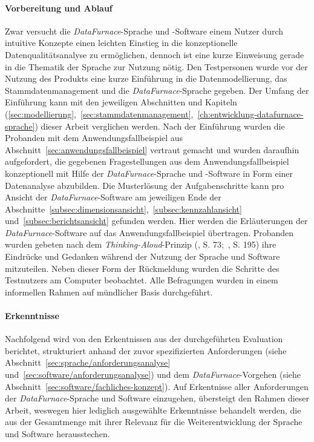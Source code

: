 \documentclass[
  language=german, %
  type=bachelor,%
  ngerman
]{isthesis}
\begin{document}
\begin{content}
\paragraph{Vorbereitung und Ablauf} Zwar versucht die
\textit{DataFurnace}-Sprache und -Software einem Nutzer durch intuitive
Konzepte einen leichten Einstieg in die konzeptionelle Datenqualitätsanalyse zu
ermöglichen, dennoch ist eine kurze Einweisung gerade in die Thematik der
Sprache zur Nutzung nötig. Den Testpersonen wurde vor der Nutzung des Produkts
eine kurze Einführung in die Datenmodellierung, das Stammdatenmanagement und
die \textit{DataFurnace}-Sprache gegeben. Der Umfang der Einführung kann mit
den jeweiligen Abschnitten und Kapiteln
(\ref{sec:modellierung},~\ref{sec:stammdatenmanagement},~\ref{ch:entwicklung-datafurnace-sprache})
dieser Arbeit verglichen werden.  Nach der Einführung wurden die Probanden mit
dem Anwendungsfallbeispiel aus Abschnitt~\ref{sec:anwendungsfallbeispiel}
vertraut gemacht und wurden daraufhin aufgefordert, die gegebenen
Fragestellungen aus dem Anwendungsfallbeispiel konzeptionell mit Hilfe der
\textit{DataFurnace}-Sprache und -Software in Form einer Datenanalyse
abzubilden. Die Musterlösung der Aufgabenschritte kann pro Ansicht der
\textit{DataFurnace}-Software am jeweiligen Ende der
Abschnitte~\ref{subsec:dimensionsansicht},~\ref{subsec:kennzahlansicht}
und~\ref{subsec:berichtsansicht} gefunden werden. Hier werden die Erläuterungen
der \textit{DataFurnace}-Software auf das Anwendungsfallbeispiel übertragen.
Probanden wurden gebeten nach dem \textit{Thinking-Aloud}-Prinzip
(\cite{holzinger2005usability}, S.  73;~\cite{nielsen1994usability}, S. 195)
ihre Eindrücke und Gedanken während der Nutzung der Sprache und Software
mitzuteilen. Neben dieser Form der Rückmeldung wurden die Schritte des
Testnutzers am Computer beobachtet. Alle Befragungen wurden in einem informellen
Rahmen auf mündlicher Basis durchgeführt.

\paragraph{Erkenntnisse} Nachfolgend wird von den Erkentnissen aus der
durchgeführten Evaluation berichtet, strukturiert anhand der zuvor
spezifizierten Anforderungen (siehe Abschnitt~\ref{sec:sprache/anforderungsanalyse}
und~\ref{sec:software/anforderungsanalyse}) und dem
\textit{DataFurnace}-Vorgehen (siehe
Abschnitt~\ref{sec:software/fachliches-konzept}). Auf Erkentnisse
aller Anforderungen der \textit{DataFurnace}-Sprache und Software einzugehen,
übersteigt den Rahmen dieser Arbeit, weswegen hier lediglich ausgewählte
Erkenntnisse behandelt werden, die aus der Gesamtmenge mit ihrer
Relevanz für die Weiterentwicklung der Sprache und Software herausstechen.


\end{content}
\end{document}
